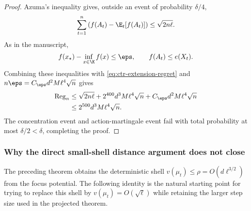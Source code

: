 \begin{proof}
    Azuma's inequality gives, outside an event of probability $\delta/4$,
    \begin{align}
        \sum_{t=1}^n
        \left(f(A_t)-\E_t[f(A_t)]\right)
        \leq\sqrt{2n\ell}.
        \label{eq:ctr-action-martingale}
    \end{align}
    As in the manuscript,
    \begin{align}
        f(x_\star)-\inf_{x\in\K}f(x)\leq\eps,
        \qquad
        f(A_t)\leq e(X_t).
    \end{align}
    Combining these inequalities with
    \eqref{eq:ctr-extension-regret} and
    $n\eps=C_\eps d^2M\ell^4\sqrt n$ gives
    \begin{align}
        \operatorname{Reg}_n
         & \leq
        \sqrt{2n\ell}
        +2^{400}d^3M\ell^4\sqrt n
        +C_\eps d^2M\ell^4\sqrt n
        \\
         & \leq2^{500}d^3M\ell^4\sqrt n.
    \end{align}
    The concentration event and action-martingale event fail with total
    probability at most $\delta/2<\delta$, completing the proof.
\end{proof}

\subsubsection{Why the direct small-shell distance argument does not close}

The preceding theorem obtains the deterministic shell
$v(\mu_t)\leq\rho=O(d\ell^{3/2})$ from the focus potential.  The following
identity is the natural starting point for trying to replace this shell by
$v(\mu_t)=O(\sqrt\ell)$ while retaining the larger step size used in the
projected theorem.

